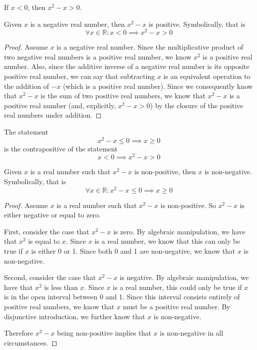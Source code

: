 \documentclass[main.tex]{subfiles}
\begin{document}
\subproblem{}\label{3a}
If \(x < 0\), then \(x^2 - x > 0\).

\begin{thm}
	Given \(x\) is a negative real number, then \(x^2 - x\) is positive.
	Symbolically, that is
	\[\forall x \in \mathbb{R}: x < 0 \implies x^2 - x > 0\]
\end{thm}
\begin{proof}
	Assume \(x\) is a negative real number. Since the multiplicative product
	of two negative real numbers is a positive real number, we know \(x^2\)
	is a positive real number. Also, since the additive inverse of a
	negative real number is its opposite positive real number, we can say
	that subtracting \(x\) is an equivalent operation to the addition of
	\(-x\) (which is a positive real number). Since we consequently know
	that \(x^2 - x\) is the sum of two positive real numbers, we know that
	\(x^2 - x\) is a positive real number (and, explicitly, \(x^2 - x > 0\))
	by the closure of the positive real numbers under addition.
\end{proof}

\begin{remark}
	The statement
	\[x^2 - x \leq 0 \implies x \geq 0\]
	is the contrapositive of the statement
	\[x < 0 \implies x^2 - x > 0\]
\end{remark}
\begin{thm}
	Given \(x\) is a real number such that \(x^2 - x\) is non-positive, then
	\(x\) is non-negative.
	Symbolically, that is
	\[\forall x \in \mathbb{R}: x^2 - x \leq 0 \implies x \geq 0\]
\end{thm}
\begin{proof}
	Assume \(x\) is a real number such that \(x^2 - x\) is non-positive. So
	\(x^2 - x\) is either negative or equal to zero.

	First, consider the case that \(x^2 - x\) is zero. By algebraic
	manipulation, we have that \(x^2\) is equal to \(x\). Since \(x\) is a
	real number, we know that this can only be true if \(x\) is either 0 or
	1. Since both 0 and 1 are non-negative, we know that \(x\) is
	non-negative.

	Second, consider the case that \(x^2 - x\) is negative. By algebraic
	manipulation, we have that \(x^2\) is less than \(x\). Since \(x\) is a
	real number, this could only be true if \(x\) is in the open interval
	between 0 and 1. Since this interval consists entirely of positive real
	numbers, we know that \(x\) must be a positive real number. By
	disjunctive introduction, we further know that \(x\) is non-negative.

	Therefore \(x^2 - x\) being non-positive implies that \(x\) is
	non-negative in all circumstances.
\end{proof}
\end{document}
